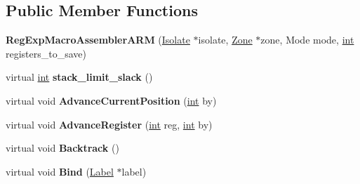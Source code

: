\subsection*{Public Member Functions}
\begin{DoxyCompactItemize}
\item 
\mbox{\label{classv8_1_1internal_1_1RegExpMacroAssemblerARM_accaa5048c0eda76cf8290c33f85895fd}} 
{\bfseries Reg\+Exp\+Macro\+Assembler\+A\+RM} (\mbox{\hyperlink{classv8_1_1internal_1_1Isolate}{Isolate}} $\ast$isolate, \mbox{\hyperlink{classv8_1_1internal_1_1Zone}{Zone}} $\ast$zone, Mode mode, \mbox{\hyperlink{classint}{int}} registers\+\_\+to\+\_\+save)
\item 
\mbox{\label{classv8_1_1internal_1_1RegExpMacroAssemblerARM_aa176dad9a2d8a917e8943e805c70810b}} 
virtual \mbox{\hyperlink{classint}{int}} {\bfseries stack\+\_\+limit\+\_\+slack} ()
\item 
\mbox{\label{classv8_1_1internal_1_1RegExpMacroAssemblerARM_a447917748bc4e9f3e24b777fef7fca4d}} 
virtual void {\bfseries Advance\+Current\+Position} (\mbox{\hyperlink{classint}{int}} by)
\item 
\mbox{\label{classv8_1_1internal_1_1RegExpMacroAssemblerARM_a9882542f3821fd6a01585ffd762a6900}} 
virtual void {\bfseries Advance\+Register} (\mbox{\hyperlink{classint}{int}} reg, \mbox{\hyperlink{classint}{int}} by)
\item 
\mbox{\label{classv8_1_1internal_1_1RegExpMacroAssemblerARM_a0ee34958d5b9f8d2be33d5d80df3e1bb}} 
virtual void {\bfseries Backtrack} ()
\item 
\mbox{\label{classv8_1_1internal_1_1RegExpMacroAssemblerARM_a2f418676c0b9a75832b84485ad46d7b8}} 
virtual void {\bfseries Bind} (\mbox{\hyperlink{classv8_1_1internal_1_1Label}{Label}} $\ast$label)
\item 
\mbox{\label{classv8_1_1internal_1_1RegExpMacroAssemblerARM_a5f1725422af4f257c79571edda201fd7}} 

\end{DoxyCompactItemize}
